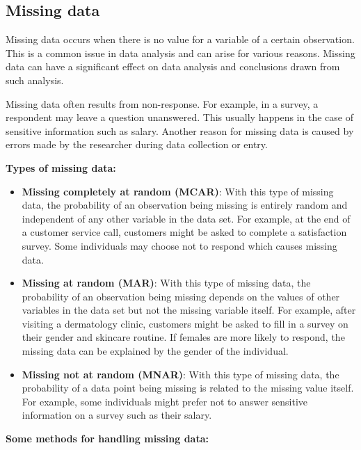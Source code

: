 \documentclass[
]{book}
\begin{document}
\subsection{Missing data}\label{missing-data}

Missing data occurs when there is no value for a variable of a certain observation. This is a common issue in data analysis and can arise for various reasons. Missing data can have a significant effect on data analysis and conclusions drawn from such analysis.

Missing data often results from non-response. For example, in a survey, a respondent may leave a question unanswered. This usually happens in the case of sensitive information such as salary. Another reason for missing data is caused by errors made by the researcher during data collection or entry.

\textbf{Types of missing data:}

\begin{itemize}
\item
  \textbf{Missing completely at random (MCAR)}: With this type of missing data, the probability of an observation being missing is entirely random and independent of any other variable in the data set. For example, at the end of a customer service call, customers might be asked to complete a satisfaction survey. Some individuals may choose not to respond which causes missing data.
\item
  \textbf{Missing at random (MAR)}: With this type of missing data, the probability of an observation being missing depends on the values of other variables in the data set but not the missing variable itself. For example, after visiting a dermatology clinic, customers might be asked to fill in a survey on their gender and skincare routine. If females are more likely to respond, the missing data can be explained by the gender of the individual.
\item
  \textbf{Missing not at random (MNAR)}: With this type of missing data, the probability of a data point being missing is related to the missing value itself. For example, some individuals might prefer not to answer sensitive information on a survey such as their salary.
\end{itemize}

\textbf{Some methods for handling missing data:}
\end{document}
